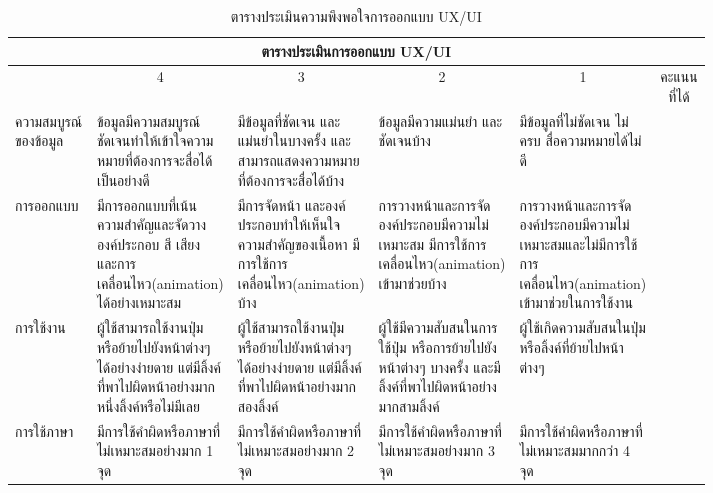 \begin{table}[H]
\caption{ตารางประเมินความพึงพอใจการออกแบบ UX/UI}\label{tbl:uxuieva}
\begin{tabular}{|p{0.13\linewidth}|p{0.17\linewidth}|p{0.17\linewidth}|p{0.17\linewidth}|p{0.17\linewidth}|c|}
\hline
\multicolumn{6}{|c|}{ตารางประเมินการออกแบบ UX/UI}                                                                                                                                                            \\ \hline

                     & \multicolumn{1}{c|}{4}                                                                                                 & \multicolumn{1}{c|}{3}                                                                                   & \multicolumn{1}{c|}{2}                                                                                        & \multicolumn{1}{c|}{1}                                                                        & คะแนนที่ได้ \\ \hline
ความสมบูรณ์ของข้อมูล    & ข้อมูลมีความสมบูรณ์   ชัดเจนทำให้เข้าใจความหมายที่ต้องการจะสื่อได้เป็นอย่างดี                                          & มีข้อมูลที่ชัดเจน   และแม่นยำในบางครั้ง และสามารถแสดงความหมายที่ต้องการจะสื่อได้บ้าง                     & ข้อมูลมีความแม่นยำ   และชัดเจนบ้าง                                                                            & มีข้อมูลที่ไม่ชัดเจน   ไม่ครบ สื่อความหมายได้ไม่ดี                                            &           \\ \hline
การออกแบบ            & มีการออกแบบที่เน้นความสำคัญและจัดวางองค์ประกอบ สี เสียง และการเคลื่อนไหว(animation) ได้อย่างเหมาะสม                                & มีการจัดหน้า   และองค์ประกอบทำให้เห็นใจความสำคัญของเนื้อหา มีการใช้การเคลื่อนไหว(animation)   บ้าง                     & การวางหน้าและการจัดองค์ประกอบมีความไม่เหมาะสม   มีการใช้การเคลื่อนไหว(animation) เข้ามาช่วยบ้าง                             & การวางหน้าและการจัดองค์ประกอบมีความไม่เหมาะสมและไม่มีการใช้  การเคลื่อนไหว(animation) เข้ามาช่วยในการใช้งาน &            \\ \hline
การใช้งาน              & ผู้ใช้สามารถใช้งานปุ่มหรือย้ายไปยังหน้าต่างๆได้อย่างง่ายดาย   แต่มีลิ้งค์ที่พาไปผิดหน้าอย่างมากหนึ่งลิ้งค์หรือไม่มีเลย & ผู้ใช้สามารถใช้งานปุ่มหรือย้ายไปยังหน้าต่างๆได้อย่างง่ายดาย   แต่มีลิ้งค์ที่พาไปผิดหน้าอย่างมากสองลิ้งค์ & ผู้ใช้มีความสับสนในการใช้ปุ่ม   หรือการย้ายไปยังหน้าต่างๆ บางครั้ง และมีลิ้งค์ที่พาไปผิดหน้าอย่างมากสามลิ้งค์ & ผู้ใช้เกิดความสับสนในปุ่มหรือลิ้งค์ที่ย้ายไปหน้าต่างๆ                                         &            \\ \hline
การใช้ภาษา            & มีการใช้คำผิดหรือภาษาที่ไม่เหมาะสมอย่างมาก   1 จุด                                                                     & มีการใช้คำผิดหรือภาษาที่ไม่เหมาะสมอย่างมาก   2 จุด                                                       & มีการใช้คำผิดหรือภาษาที่ไม่เหมาะสมอย่างมาก 3 จุด                                                              & มีการใช้คำผิดหรือภาษาที่ไม่เหมาะสมมากกว่า 4 จุด                                               &            \\ \hline
\end{tabular}
\end{table}

